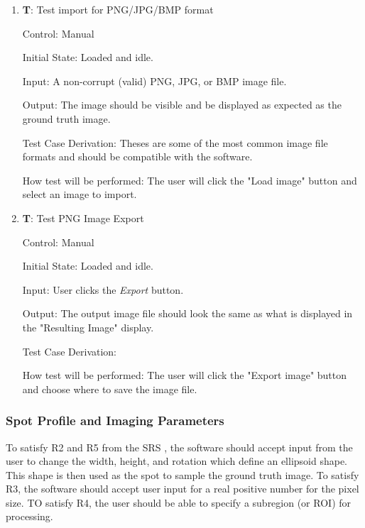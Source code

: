 \documentclass[12pt, titlepage]{article}
\newcounter{testnum} %
\begin{document}
\begin{enumerate}

  \item{\textbf{T\thetestnum \label{T_inputImage}}: Test import for PNG/JPG/BMP format\\}
            
  Control: Manual
            
  Initial State: Loaded and idle.
            
  Input: A non-corrupt (valid) PNG, JPG, or BMP image file.
            
  Output: The image should be visible and be displayed as expected as the ground truth image.
            
  Test Case Derivation: Theses are some of the most common image file formats and should be compatible with the software.
            
  How test will be performed: The user will click the "Load image" button and select an image to import.

  \item{\textbf{T\thetestnum \label{T_exportImage}}: Test PNG Image Export\\}
              
  Control: Manual
            
  Initial State: Loaded and idle.
            
  Input: User clicks the \textit{Export} button.
            
  Output: The output image file should look the same as what is displayed in the "Resulting Image" display.

  Test Case Derivation: 

  How test will be performed: The user will click the "Export image" button and choose where to save the image file.

\end{enumerate}


\subsubsection{Spot Profile and Imaging Parameters}

To satisfy R2 and R5 from the SRS \citep{SRS}, the software should accept input from the user
to change the width, height, and rotation which define an ellipsoid shape. 
This shape is then used as the spot to sample the ground truth image.
To satisfy R3, the software should accept user input for a real positive number for the pixel size.
TO satisfy R4, the user should be able to specify a subregion (or ROI) for processing.
\end{document}
